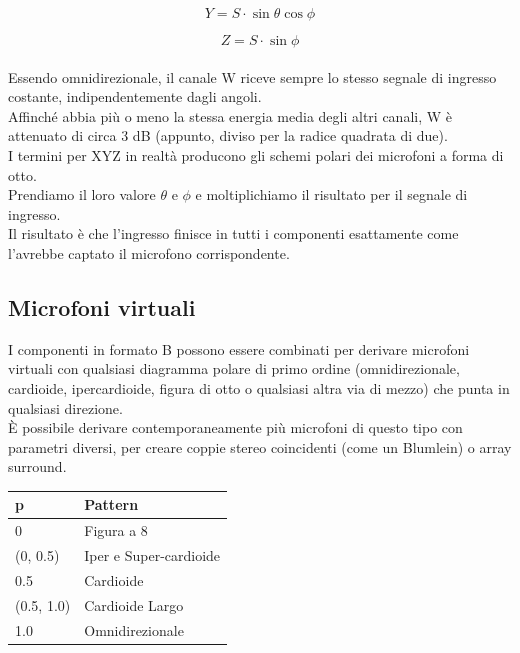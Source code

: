\begin{equation}
      Y =S\cdot\sin\theta\cos\phi
\end{equation}

\begin{equation}
      Z=S\cdot\sin\phi
\end{equation}
\\

Essendo omnidirezionale, il canale W riceve sempre lo stesso segnale di ingresso costante, indipendentemente dagli angoli. \\
Affinché abbia più o meno la stessa energia media degli altri canali, W è attenuato di circa 3 dB (appunto, diviso per la radice quadrata di due).\\
 I termini per XYZ in realtà producono gli schemi polari dei microfoni a forma di otto. \\ 
 Prendiamo il loro valore $\theta$ e $\phi$ e moltiplichiamo il risultato per il segnale di ingresso.\\
  Il risultato è che l'ingresso finisce in tutti i componenti esattamente come l'avrebbe captato il microfono corrispondente.

\subsection{Microfoni virtuali}

I componenti in formato B possono essere combinati per derivare microfoni virtuali con qualsiasi diagramma polare di primo ordine (omnidirezionale, cardioide, ipercardioide, figura di otto o qualsiasi altra via di mezzo) che punta in qualsiasi direzione.
 \\È possibile derivare contemporaneamente più microfoni di questo tipo con parametri diversi, per creare coppie stereo coincidenti (come un Blumlein) o array surround.

 \begin{center}
 \captionsetup{type=table}
\begin{tabular}{||p{3.0cm}|p{3.0cm}||} 
      \hline\hline
      p & Pattern \\
      \hline\hline
      0 & Figura a 8 \\
      \hline\hline
      (0, 0.5) & Iper e Super-cardioide\\
      \hline\hline
      0.5 & Cardioide \\
      \hline\hline
      (0.5, 1.0) & Cardioide Largo \\
      \hline\hline
      1.0 & Omnidirezionale \\
      \hline\hline
      \end{tabular}
\end{center}


